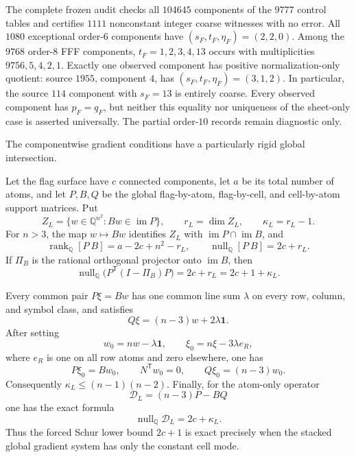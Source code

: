 The complete frozen audit checks all $104645$ components of the $9777$
control tables and certifies $1111$ nonconstant integer coarse witnesses with
no error.  All $1080$ exceptional order-$6$ components have
$(s_F,t_F,\eta_F)=(2,2,0)$.  Among the $9768$ order-$8$ FFF components,
$t_F=1,2,3,4,13$ occurs with multiplicities $9756,5,4,2,1$.  Exactly one
observed component has positive normalization-only quotient: source $1955$,
component $4$, has $(s_F,t_F,\eta_F)=(3,1,2)$.  In particular, the source
$114$ component with $s_F=13$ is entirely coarse.  Every observed component
has $p_F=q_F$, but neither this equality nor uniqueness of the sheet-only
case is asserted universally.  The partial order-$10$ records remain
diagnostic only.

The componentwise gradient conditions have a particularly rigid global
intersection.

\begin{theorem}
\label{thm:global-common-mode}
Let the flag surface have $c$ connected components, let $a$ be its total
number of atoms, and let $P,B,Q$ be the global flag-by-atom,
flag-by-cell, and cell-by-atom support matrices.  Put
\[
 Z_L=\{w\in\mathbb Q^{n^2}:Bw\in\operatorname{im}P\},\qquad
 r_L=\dim Z_L,\qquad \kappa_L=r_L-1.
\]
For $n>3$, the map $w\mapsto Bw$ identifies $Z_L$ with
$\operatorname{im}P\cap\operatorname{im}B$, and
\[
 \operatorname{rank}_{\mathbb Q}[P\ B]=a-2c+n^2-r_L,
 \qquad
 \operatorname{null}_{\mathbb Q}[P\ B]=2c+r_L.       \tag{17}
\]
If $\Pi_B$ is the rational orthogonal projector onto
$\operatorname{im}B$, then
\[
 \operatorname{null}_{\mathbb Q}
 \bigl(P^{\mathsf T}(I-\Pi_B)P\bigr)
 =2c+r_L=2c+1+\kappa_L.                              \tag{18}
\]

Every common pair $P\xi=Bw$ has one common line sum $\lambda$ on every row,
column, and symbol class, and satisfies
\[
 Q\xi=(n-3)w+2\lambda\mathbf1.                       \tag{19}
\]
After setting
\[
 w_0=nw-\lambda\mathbf1,\qquad
 \xi_0=n\xi-3\lambda e_R,
\]
where $e_R$ is one on all row atoms and zero elsewhere, one has
\[
 P\xi_0=Bw_0,\qquad N^{\mathsf T}w_0=0,
 \qquad Q\xi_0=(n-3)w_0.                             \tag{20}
\]
Consequently $\kappa_L\leq(n-1)(n-2)$.  Finally, for the atom-only operator
\[
 \mathcal D_L=(n-3)P-BQ
\]
one has the exact formula
\[
 \operatorname{null}_{\mathbb Q}\mathcal D_L=2c+\kappa_L.    \tag{21}
\]
Thus the forced Schur lower bound $2c+1$ is exact precisely when the stacked
global gradient system has only the constant cell mode.
\end{theorem}

